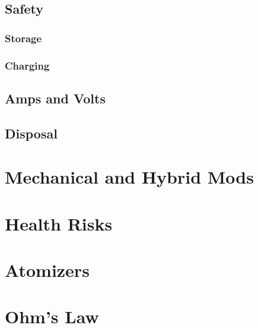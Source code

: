 \documentclass{article}
\begin{document}
	\subsection*{Safety}
		\subsubsection*{Storage}
		\subsubsection*{Charging}
	\subsection*{Amps and Volts}
	\subsection*{Disposal}
\section*{Mechanical and Hybrid Mods}
\section*{Health Risks}
\section*{Atomizers}
\section*{Ohm's Law}
\end{document}
